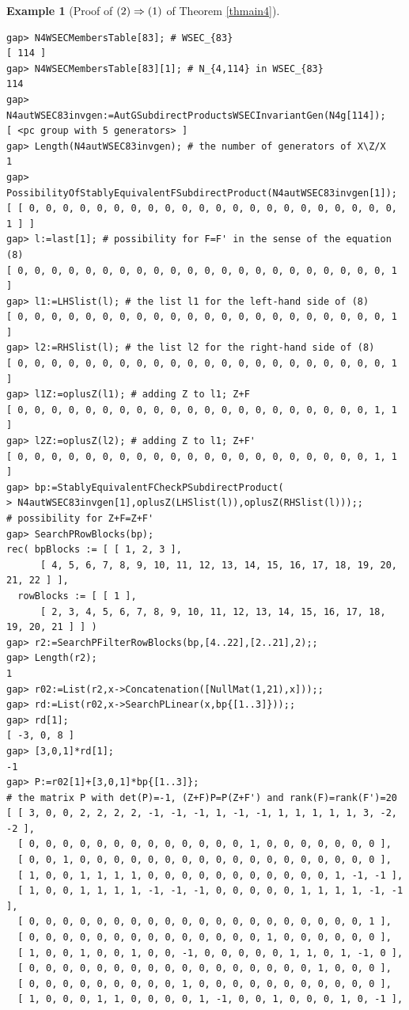 \documentclass{amsart}
\theoremstyle{plain}
\theoremstyle{definition}
\newtheorem{example}[theorem]{Example}
\theoremstyle{remark}
\begin{document}
\begin{example}[Proof of ${\rm (2)}\Rightarrow {\rm (1)}$ of {Theorem \ref{thmain4}}]
\begin{verbatim}
gap> N4WSECMembersTable[83]; # WSEC_{83}
[ 114 ]
gap> N4WSECMembersTable[83][1]; # N_{4,114} in WSEC_{83}
114
gap> N4autWSEC83invgen:=AutGSubdirectProductsWSECInvariantGen(N4g[114]);
[ <pc group with 5 generators> ]
gap> Length(N4autWSEC83invgen); # the number of generators of X\Z/X
1
gap> PossibilityOfStablyEquivalentFSubdirectProduct(N4autWSEC83invgen[1]);
[ [ 0, 0, 0, 0, 0, 0, 0, 0, 0, 0, 0, 0, 0, 0, 0, 0, 0, 0, 0, 0, 0, 0, 1 ] ]
gap> l:=last[1]; # possibility for F=F' in the sense of the equation (8)
[ 0, 0, 0, 0, 0, 0, 0, 0, 0, 0, 0, 0, 0, 0, 0, 0, 0, 0, 0, 0, 0, 0, 1 ]
gap> l1:=LHSlist(l); # the list l1 for the left-hand side of (8)
[ 0, 0, 0, 0, 0, 0, 0, 0, 0, 0, 0, 0, 0, 0, 0, 0, 0, 0, 0, 0, 0, 0, 1 ]
gap> l2:=RHSlist(l); # the list l2 for the right-hand side of (8)
[ 0, 0, 0, 0, 0, 0, 0, 0, 0, 0, 0, 0, 0, 0, 0, 0, 0, 0, 0, 0, 0, 0, 1 ]
gap> l1Z:=oplusZ(l1); # adding Z to l1; Z+F
[ 0, 0, 0, 0, 0, 0, 0, 0, 0, 0, 0, 0, 0, 0, 0, 0, 0, 0, 0, 0, 0, 1, 1 ]
gap> l2Z:=oplusZ(l2); # adding Z to l1; Z+F'
[ 0, 0, 0, 0, 0, 0, 0, 0, 0, 0, 0, 0, 0, 0, 0, 0, 0, 0, 0, 0, 0, 1, 1 ]
gap> bp:=StablyEquivalentFCheckPSubdirectProduct(
> N4autWSEC83invgen[1],oplusZ(LHSlist(l)),oplusZ(RHSlist(l)));; 
# possibility for Z+F=Z+F'
gap> SearchPRowBlocks(bp);
rec( bpBlocks := [ [ 1, 2, 3 ], 
      [ 4, 5, 6, 7, 8, 9, 10, 11, 12, 13, 14, 15, 16, 17, 18, 19, 20, 21, 22 ] ], 
  rowBlocks := [ [ 1 ], 
      [ 2, 3, 4, 5, 6, 7, 8, 9, 10, 11, 12, 13, 14, 15, 16, 17, 18, 19, 20, 21 ] ] )
gap> r2:=SearchPFilterRowBlocks(bp,[4..22],[2..21],2);;
gap> Length(r2);
1
gap> r02:=List(r2,x->Concatenation([NullMat(1,21),x]));;
gap> rd:=List(r02,x->SearchPLinear(x,bp{[1..3]}));;
gap> rd[1];
[ -3, 0, 8 ]
gap> [3,0,1]*rd[1];
-1
gap> P:=r02[1]+[3,0,1]*bp{[1..3]};
# the matrix P with det(P)=-1, (Z+F)P=P(Z+F') and rank(F)=rank(F')=20
[ [ 3, 0, 0, 2, 2, 2, 2, -1, -1, -1, 1, -1, -1, 1, 1, 1, 1, 1, 3, -2, -2 ], 
  [ 0, 0, 0, 0, 0, 0, 0, 0, 0, 0, 0, 0, 0, 1, 0, 0, 0, 0, 0, 0, 0 ], 
  [ 0, 0, 1, 0, 0, 0, 0, 0, 0, 0, 0, 0, 0, 0, 0, 0, 0, 0, 0, 0, 0 ], 
  [ 1, 0, 0, 1, 1, 1, 1, 0, 0, 0, 0, 0, 0, 0, 0, 0, 0, 0, 1, -1, -1 ], 
  [ 1, 0, 0, 1, 1, 1, 1, -1, -1, -1, 0, 0, 0, 0, 0, 1, 1, 1, 1, -1, -1 ], 
  [ 0, 0, 0, 0, 0, 0, 0, 0, 0, 0, 0, 0, 0, 0, 0, 0, 0, 0, 0, 0, 1 ], 
  [ 0, 0, 0, 0, 0, 0, 0, 0, 0, 0, 0, 0, 0, 0, 1, 0, 0, 0, 0, 0, 0 ], 
  [ 1, 0, 0, 1, 0, 0, 1, 0, 0, -1, 0, 0, 0, 0, 0, 1, 1, 0, 1, -1, 0 ], 
  [ 0, 0, 0, 0, 0, 0, 0, 0, 0, 0, 0, 0, 0, 0, 0, 0, 0, 1, 0, 0, 0 ], 
  [ 0, 0, 0, 0, 0, 0, 0, 0, 0, 1, 0, 0, 0, 0, 0, 0, 0, 0, 0, 0, 0 ], 
  [ 1, 0, 0, 0, 1, 1, 0, 0, 0, 0, 1, -1, 0, 0, 1, 0, 0, 0, 1, 0, -1 ], 

\end{verbatim}
\end{example}
\end{document}
